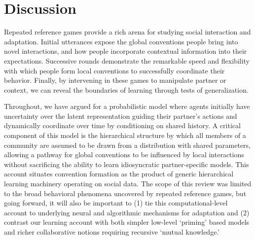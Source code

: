 \section{Discussion}

Repeated reference games provide a rich arena for studying social interaction and adaptation. Initial utterances expose the global conventions people bring into novel interactions, and how people incorporate contextual information into their expectations. Successive rounds demonstrate the remarkable speed and flexibility with which people form local conventions to successfully coordinate their behavior. Finally, by intervening in these games to manipulate partner or context, we can reveal the boundaries of learning through tests of generalization. 

Throughout, we have argued for a probabilistic model where agents initially have uncertainty over the latent representation guiding their partner's actions and dynamically coordinate over time by conditioning on shared history. 
A critical component of this model is the hierarchical structure by which all members of a community are assumed to be drawn from a distribution with shared parameters, allowing a pathway for global conventions to be influenced by local interactions without sacrificing the ability to learn idiosyncratic partner-specific models. 
This account situates convention formation as the product of generic hierarchical learning machinery operating on social data.
The scope of this review was limited to the broad behavioral phenomena uncovered by repeated reference games, but going forward, it will also be important to (1) tie this computational-level account to underlying neural and algorithmic mechanisms for adaptation and (2) contrast our learning account with both simpler low-level `priming' based models and richer collaborative notions requiring recursive `mutual knowledge.' 


